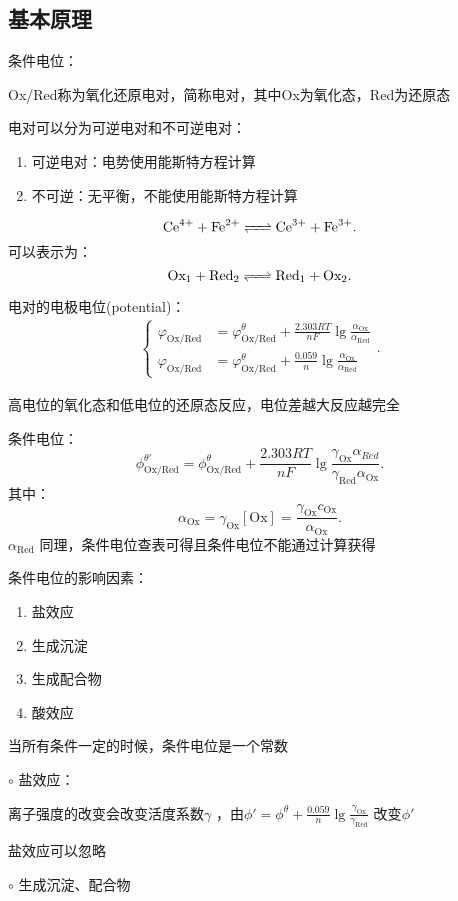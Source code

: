 \subsection{基本原理}%
\label{sub:基本原理}
条件电位：
\begin{defi}
Ox/Red称为氧化还原电对，简称电对，其中Ox为氧化态，Red为还原态
\end{defi}
\begin{notation}
    电对可以分为可逆电对和不可逆电对：
    \begin{enumerate}
        \item 可逆电对：电势使用能斯特方程计算
        \item 不可逆：无平衡，不能使用能斯特方程计算
    \end{enumerate}
\end{notation}
\begin{eg}
     \[
         \ce{Ce^4+ +Fe^2+}\ce{<=>[][]}\ce{Ce^3+ +Fe^3+}
     .\]
     可以表示为：
      \[
         \text{Ox}_1+\text{Red}_2 \ce{<=>[][]} \text{Red}_1+\text{Ox}_2
     .\]
\end{eg}
电对的电极电位(potential)：
\begin{align*}
    \begin{cases}
        \varphi_\text{Ox/Red}&= \varphi_\text{Ox/Red}^\theta+\frac{2.303RT}{nF}\lg \frac{\alpha_\text{Ox}}{\alpha_\text{Red}} \\
        \varphi_\text{Ox/Red}&= \varphi_\text{Ox/Red}^\theta+\frac{0.059}{n}\lg \frac{\alpha_\text{Ox}}{\alpha_\text{Red}}
    \end{cases}
.\end{align*}
\begin{notation}
    高电位的氧化态和低电位的还原态反应，电位差越大反应越完全
\end{notation}
条件电位：\[
    \phi_\text{Ox/Red}^{\theta'}=\phi_\text{Ox/Red}^\theta+\frac{2.303RT}{nF}\lg \frac{\gamma_\text{Ox}\alpha_{Red}}{\gamma_\text{Red}\alpha_\text{Ox}}
.\]
其中：\[
    \alpha_\text{Ox}=\gamma_\text{Ox}[\text{Ox}]=\frac{\gamma_\text{Ox}c_\text{Ox}}{\alpha_\text{Ox}}
.\]
$\alpha_\text{Red}$ 同理，条件电位查表可得且条件电位不能通过计算获得
\begin{notation}
条件电位的影响因素：
\begin{enumerate}
    \item 盐效应
    \item 生成沉淀
    \item 生成配合物
    \item 酸效应
\end{enumerate}
当所有条件一定的时候，条件电位是一个常数
\end{notation}
$\circ$ 盐效应：

离子强度的改变会改变活度系数$\gamma$ ，由$\phi'=\phi^{\theta}+\frac{0.059}{n}\lg \frac{\gamma_\text{Ox}}{\gamma_\text{Red}}$ 改变$\phi'$

盐效应可以忽略

$\circ$ 生成沉淀、配合物
